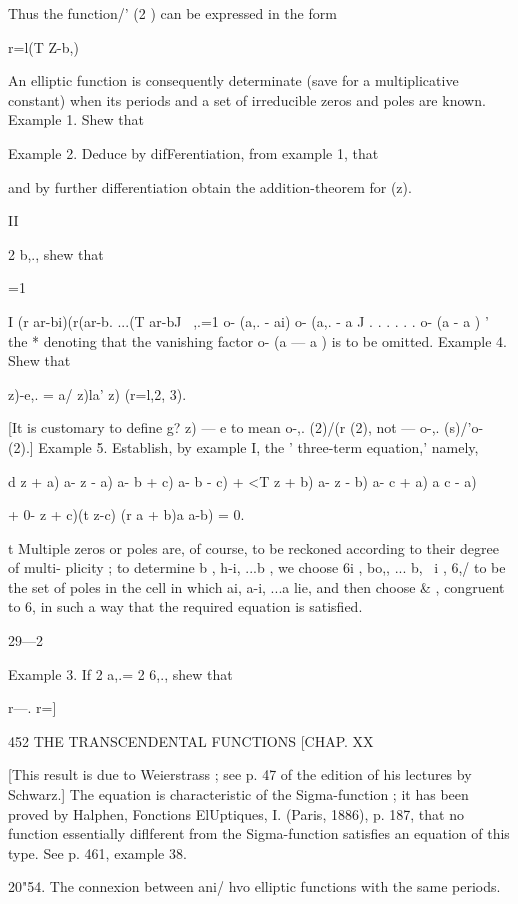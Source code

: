 {Thus the function/' (2 ) can be expressed in the form 

r=l(T Z-b,) 

An elliptic function is consequently determinate (save for a multiplicative 
constant) when its periods and a set of irreducible zeros and poles are known. 
Example 1. Shew that 

Example 2. Deduce by difFerentiation, from example 1, that 

and by further differentiation obtain the addition-theorem for   (z). 

II 

2 b,., shew that 

=1 

I (r ar-bi)(r(ar-b. ...(T ar-bJ \   
,.=1 o- (a,. - ai) o- (a,. - a J . . .   . . . o- (a  - a ) ' 
the * denoting that the vanishing factor o- (a  — a ) is to be omitted. 
Example 4. Shew that 

  z)-e,. = a/ z)la'  z) (r=l,2, 3). 

[It is customary to define  g?  z) — e    to mean o-,. (2)/(r (2), not — o-,. (s)/'o- (2).] 
Example 5. Establish, by example I, the ' three-term equation,' namely, 

d  z + a) a-  z - a) a-  b + c) a-  b - c) + <T  z + b) a-  z - b) a-  c + a) a  c - a) 

+ 0-  z + c)(t z-c) (r a + b)a  a-b) = 0. 

t Multiple zeros or poles are, of course, to be reckoned according to their degree of multi- 
plicity ; to determine b , h-i, ...b , we choose 6i , bo,, ... b, \ i , 6,/ to be the set of poles in the cell in 
which ai, a-i, ...a  lie, and then choose \& , congruent to 6,  in such a way that the required 
equation is satisfied. 

29—2 



Example 3. If 2 a,.= 2 6,., shew that 

r—.  r=] 



452 THE TRANSCENDENTAL FUNCTIONS [CHAP. XX 

[This result is due to Weierstrass ; see p. 47 of the edition of his lectures by Schwarz.] 
The equation is characteristic of the Sigma-function ; it has been proved by Halphen, 
Fonctions ElUptiques, I. (Paris, 1886), p. 187, that no function essentially diflferent from the 
Sigma-function satisfies an equation of this type. See p. 461, example 38. 

20"54. The connexion between ani/ hvo elliptic functions with the same 
periods. 

}

